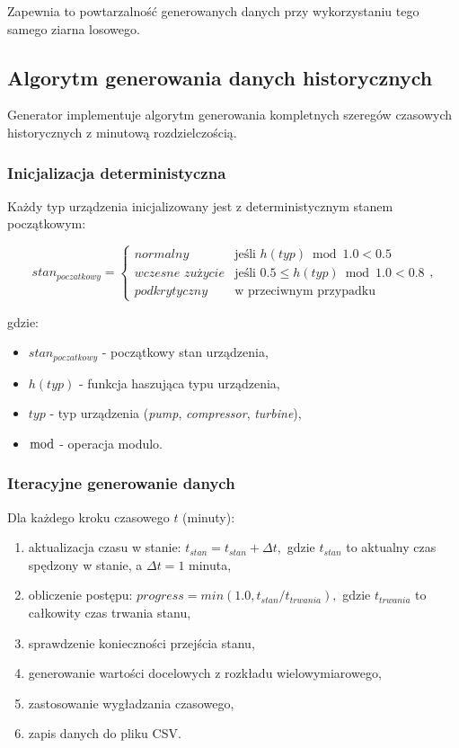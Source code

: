 Zapewnia to powtarzalność generowanych danych przy wykorzystaniu tego samego ziarna losowego.

\subsection{Algorytm generowania danych historycznych}
\label{subsec:algorytm_historycznych}

Generator implementuje algorytm generowania kompletnych szeregów czasowych historycznych z minutową rozdzielczością.

\subsubsection{Inicjalizacja deterministyczna}

Każdy typ urządzenia inicjalizowany jest z deterministycznym stanem początkowym:

\begin{equation}
stan_{poczatkowy} = \begin{cases}
\textit{normalny} & \text{je\'sli } h(typ) \bmod 1.0 < 0.5 \\
\textit{wczesne zu\.{z}ycie} & \text{je\'sli } 0.5 \leq h(typ) \bmod 1.0 < 0.8 \\
\textit{podkrytyczny} & \text{w przeciwnym przypadku}
\end{cases},
\end{equation}

gdzie:
\begin{itemize}
    \item $stan_{poczatkowy}$ - początkowy stan urządzenia,
    \item $h(typ)$ - funkcja haszująca typu urządzenia,
    \item $typ$ - typ urządzenia (\textit{pump}, \textit{compressor}, \textit{turbine}),
    \item $\bmod$ - operacja modulo.
\end{itemize}

\subsubsection{Iteracyjne generowanie danych}

Dla każdego kroku czasowego $t$ (minuty):

\begin{enumerate}
    \item aktualizacja czasu w stanie: $t_{stan} = t_{stan} + \Delta t,$ gdzie $t_{stan}$ to aktualny czas spędzony w stanie, a $\Delta t = 1$ minuta,
    \item obliczenie postępu: $progress = \textit{min}(1.0, t_{stan} / t_{trwania}),$ gdzie $t_{trwania}$ to całkowity czas trwania stanu,
    \item sprawdzenie konieczności przejścia stanu,
    \item generowanie wartości docelowych z rozkładu wielowymiarowego,
    \item zastosowanie wygładzania czasowego,
    \item zapis danych do pliku CSV.
\end{enumerate}

